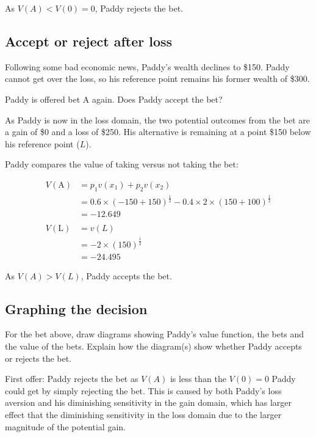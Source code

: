 \documentclass[
  letterpaper,
  DIV=11,
  numbers=noendperiod]{scrreprt}
\begin{document}
As \(V(A)<V(0)=0\), Paddy rejects the bet.

\hypertarget{accept-or-reject-after-loss-1}{%
\subsection{Accept or reject after
loss}\label{accept-or-reject-after-loss-1}}

Following some bad economic news, Paddy's wealth declines to \$150.
Paddy cannot get over the loss, so his reference point remains his
former wealth of \$300.

Paddy is offered bet A again. Does Paddy accept the bet?

As Paddy is now in the loss domain, the two potential outcomes from the
bet are a gain of \$0 and a loss of \$250. His alternative is remaining
at a point \$150 below his reference point (\(L\)).

Paddy compares the value of taking versus not taking the bet:

\begin{align*}
V(\text{A})&=p_1v(x_1)+p_2v(x_2) \\
&=0.6\times (-150+150)^{\frac{1}{2}}-0.4\times 2\times (150+100)^{\frac{1}{2}} \\
&=-12.649 \\
\\
V(\text{L})&=v(L) \\
&=-2\times (150)^{\frac{1}{2}} \\
&=-24.495
\end{align*}

As \(V(A)>V(L)\), Paddy accepts the bet.

\hypertarget{graphing-the-decision}{%
\subsection{Graphing the decision}\label{graphing-the-decision}}

For the bet above, draw diagrams showing Paddy's value function, the
bets and the value of the bets. Explain how the diagram(s) show whether
Paddy accepts or rejects the bet.

First offer: Paddy rejects the bet as \(V(A)\) is less than the
\(V(0)=0\) Paddy could get by simply rejecting the bet. This is caused
by both Paddy's loss aversion and his diminishing sensitivity in the
gain domain, which has larger effect that the diminishing sensitivity in
the loss domain due to the larger magnitude of the potential gain.
\end{document}
